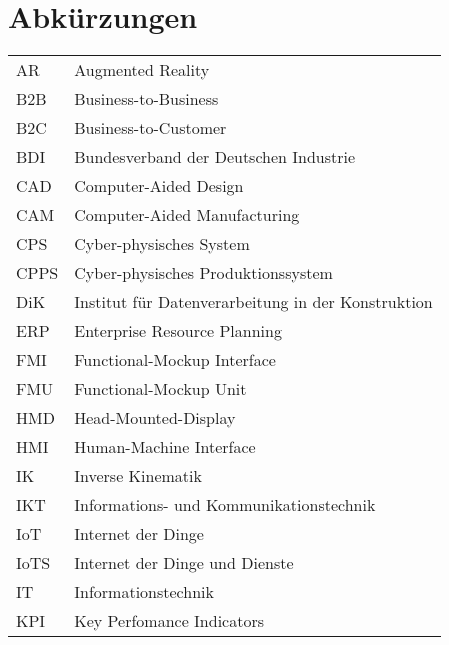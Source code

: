 \chapter*{Abkürzungen}\label{cha:Abkürzungen}
\begin{tabular}{l l} 
		AR 		& 	Augmented Reality  \\
		B2B 	& 	Business-to-Business \\
		B2C		&	Business-to-Customer \\
		BDI		&	Bundesverband der Deutschen Industrie \\
		CAD		&	Computer-Aided Design \\
		CAM		&	Computer-Aided Manufacturing \\
		CPS		&  	Cyber-physisches System \\
		CPPS 	& 	Cyber-physisches Produktionssystem \\
		DiK 	& 	Institut für Datenverarbeitung in der Konstruktion \\
		ERP 	& 	Enterprise Resource Planning  \\
		FMI 	& 	Functional-Mockup Interface \\
		FMU 	& 	Functional-Mockup Unit \\
		HMD		&	Head-Mounted-Display \\
		HMI		&	Human-Machine Interface \\
		IK		&	Inverse Kinematik \\
		IKT		& 	Informations- und Kommunikationstechnik \\
		IoT		&	Internet der Dinge \\
		IoTS 	& 	Internet der Dinge und Dienste \\
		IT		&	Informationstechnik \\
		KPI 	& 	Key Perfomance Indicators \\

\end{tabular}
